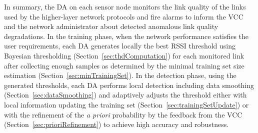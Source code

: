  


In summary, the DA on each sensor node monitors the link quality of the links used by the higher-layer network protocols and fire alarms to inform the VCC and the network administrator about detected anomalous link quality degradations. In the training phase, when the network performance satisfies the user requirements, each DA generates locally the best RSSI threshold using Bayesian thresholding (Section~\ref{sec:thdComputation}) for each monitored link after collecting enough samples as determined by the minimal training set size estimation (Section~\ref{sec:minTrainingSet}). In the detection phase, using the generated thresholds, each DA performs local detection including data smoothing (Section~\ref{sec:dataSmoothing}) and adaptively adjusts the threshold either with local information updating the training set (Section~\ref{sec:trainingSetUpdate}) or with the refinement of the \textit{a priori} probability by the feedback from the VCC (Section~\ref{sec:prioriRefinement}) to achieve high accuracy and robustness.

